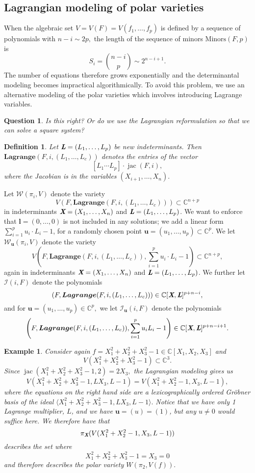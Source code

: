 \documentclass[a4paper]{article}
\def\sW{\mathscr{W}}
\def\sI{\mathscr{I}}
\def\Lb{\textit{\textbf{L}}}
\def\Xb{\textit{\textbf{X}}}
\def\ub{{\bm u}}
\def\lb{{\bm l}}
\DeclareMathOperator{\jac}{jac}
\def\minors{\textrm{Minors}(F,p)}
\def\C{\mathbb{C}}
\def\lagF{{\bm{Lagrange}}(F,i,(L_1,\hdots,L_c))}
\def\Iil{\mathscr{I}_{\ub}(i,F)}
\def\Wil{\mathscr{W}_{\ub}(\pi_i,V)}
\def\la{\langle}
\def\ra{\rangle}
\newtheorem{ex}[theorem]{Example}
\newtheorem{definition}[theorem]{Definition}
\newtheorem{question}{Question}
\begin{document}
\subsection{Lagrangian modeling of polar varieties} 
%
When the algebraic set $V=V(F)=V(f_1,\hdots,f_p)$ is defined by a sequence of polynomials with $n-i \sim 2p,$ the length of the sequence of minors $\minors$ is \[S_i = \binom{n-i}{p}\sim 2^{n-i+1}.\] 
The number of equations therefore grows exponentially and the determinantal modeling becomes impractical algorithmically. To avoid this problem, we use an alternative modeling of the polar varieties which involves introducing Lagrange variables. 
%
\begin{question}
Is this right? Or do we use the Lagrangian reformulation so that we can solve a square system? 
\end{question}
%
\begin{definition}
Let $\Lb = (L_1,\hdots,L_p)$ be new indeterminants. Then $\lagF$ denotes the entries of the vector
\[
[L_1\cdots L_p]\cdot \jac (F,i),
\] 
where the Jacobian is in the variables $(X_{i+1},\hdots,X_n).$
\end{definition}
%
\noindent 
Let $\sW(\pi_i,V)$ denote the variety
\[
V\left(F, \lagF\right) \subset \C^{n+p} 
\]
in indeterminants $\Xb=(X_1,\hdots,X_n)$ and $\Lb=(L_1,\hdots,L_p)$. We want to enforce that $\lb = (0,\hdots,0)$ is not included in any solutions; we add a linear form $\sum_{i=1}^pu_i\cdot L_i-1$, for a randomly chosen point $\ub = (u_1,\hdots,u_p) \subset \C^p.$ We let $\Wil$ denote the variety
\[
V\left(F, \lagF,\sum_{i=1}^pu_i\cdot L_i-1\right) \subset \C^{n+p},
\]
again in indeterminants $\Xb=(X_1,\hdots,X_n)$ and $\Lb=(L_1,\hdots,L_p)$. We further let $\sI(i,F)$
denote the polynomials 
\[
\left(F, \lagF \right) \in \C[\Xb,\Lb]^{p+n-i},
\]
and for $\ub = (u_1,\hdots,u_p) \in \C^p,$ we let $\Iil$ denote the polynomials
\[
\left(F, \lagF,\sum_{i=1}^pu_iL_i-1 \right)\in \C[\Xb,\Lb]^{p+n-i+1}.
\]
%
%
%
\begin{ex}
Consider again $f=X_1^2 + X_2^2 + X_3^2-1 \in \C[X_1,X_2,X_3]$ and 
\[V(X_1^2 + X_2^2 + X_3^2-1)\subset \C^3.\]
Since $\jac(X_1^2 + X_2^2 + X_3^2-1,2)=2X_3,$ the Lagrangian modeling gives us 
\[
 V(X_1^2 + X_2^2 + X_3^2-1, LX_3, L-1) = V(X_1^2 + X_2^2-1,X_3,L-1),
\]
where the equations on the right hand side are a lexicographically ordered Gr\"obner basis of the ideal $\la X_1^2 + X_2^2 + X_3^2-1, LX_3, L-1 \ra.$ 
Notice that we have only 1 Lagrange multiplier, $L$,  and we have $\ub=(u)=(1)$, but any $u \not = 0$ would suffice here. We therefore have that \[ \pi_{\Xb}(V(X_1^2 + X_2^2-1,X_3,L-1))\] describes the set where 
\[ X_1^2 + X_2^2 + X_3^2-1 = X_3 = 0\] and therefore describes the polar variety $W(\pi_2,V(f)).$
%
\end{ex}
\end{document}
